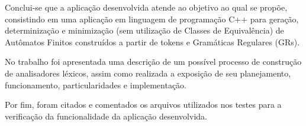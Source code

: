 \documentclass[12pt]{article}
\begin{document}
Conclui-se que a aplicação desenvolvida atende ao objetivo ao qual se propõe, consistindo em uma aplicação em linguagem de programação C++ para geração, determinização e minimização (sem utilização de Classes de Equivalência) de Autômatos Finitos construídos a partir de tokens e Gramáticas Regulares (GRs).

No trabalho foi apresentada uma descrição de um possível processo de construção de analisadores léxicos, assim como realizada a exposição de seu planejamento, funcionamento, particularidades e implementação.

Por fim, foram citados e comentados os arquivos utilizados nos testes para a verificação da funcionalidade da aplicação desenvolvida.



\end{document}
